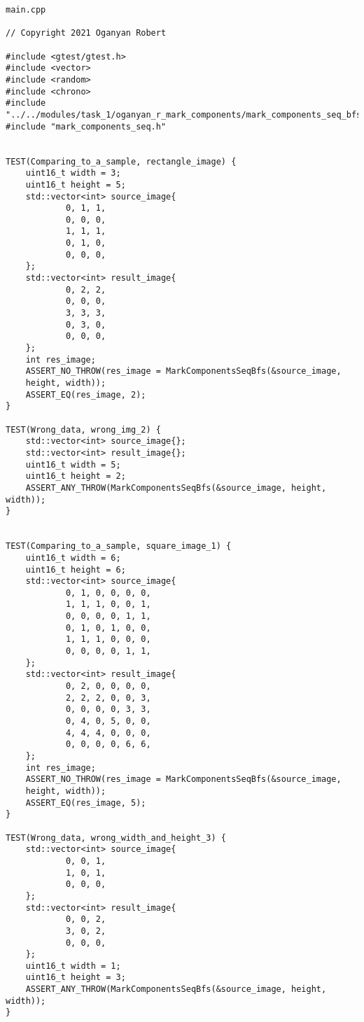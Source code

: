 \documentclass{report}
\begin{document}
\begin{lstlisting}
main.cpp

// Copyright 2021 Oganyan Robert

#include <gtest/gtest.h>
#include <vector>
#include <random>
#include <chrono>
#include "../../modules/task_1/oganyan_r_mark_components/mark_components_seq_bfs.h"
#include "mark_components_seq.h"


TEST(Comparing_to_a_sample, rectangle_image) {
    uint16_t width = 3;
    uint16_t height = 5;
    std::vector<int> source_image{
            0, 1, 1,
            0, 0, 0,
            1, 1, 1,
            0, 1, 0,
            0, 0, 0,
    };
    std::vector<int> result_image{
            0, 2, 2,
            0, 0, 0,
            3, 3, 3,
            0, 3, 0,
            0, 0, 0,
    };
    int res_image;
    ASSERT_NO_THROW(res_image = MarkComponentsSeqBfs(&source_image,
    height, width));
    ASSERT_EQ(res_image, 2);
}

TEST(Wrong_data, wrong_img_2) {
    std::vector<int> source_image{};
    std::vector<int> result_image{};
    uint16_t width = 5;
    uint16_t height = 2;
    ASSERT_ANY_THROW(MarkComponentsSeqBfs(&source_image, height, width));
}


TEST(Comparing_to_a_sample, square_image_1) {
    uint16_t width = 6;
    uint16_t height = 6;
    std::vector<int> source_image{
            0, 1, 0, 0, 0, 0,
            1, 1, 1, 0, 0, 1,
            0, 0, 0, 0, 1, 1,
            0, 1, 0, 1, 0, 0,
            1, 1, 1, 0, 0, 0,
            0, 0, 0, 0, 1, 1,
    };
    std::vector<int> result_image{
            0, 2, 0, 0, 0, 0,
            2, 2, 2, 0, 0, 3,
            0, 0, 0, 0, 3, 3,
            0, 4, 0, 5, 0, 0,
            4, 4, 4, 0, 0, 0,
            0, 0, 0, 0, 6, 6,
    };
    int res_image;
    ASSERT_NO_THROW(res_image = MarkComponentsSeqBfs(&source_image,
    height, width));
    ASSERT_EQ(res_image, 5);
}

TEST(Wrong_data, wrong_width_and_height_3) {
    std::vector<int> source_image{
            0, 0, 1,
            1, 0, 1,
            0, 0, 0,
    };
    std::vector<int> result_image{
            0, 0, 2,
            3, 0, 2,
            0, 0, 0,
    };
    uint16_t width = 1;
    uint16_t height = 3;
    ASSERT_ANY_THROW(MarkComponentsSeqBfs(&source_image, height, width));
}


\end{lstlisting}
\end{document}
